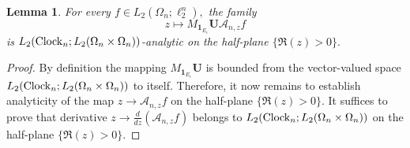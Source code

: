 \documentclass{amsart}
\numberwithin{equation}{section}
\newtheorem{lem}[thm]{Lemma}
\theoremstyle{definition}
\theoremstyle{remark}
\newcommand{\1}{\mathbf 1}
\begin{document}
\begin{lem}\label{final analyticity lemma} For every $f\in L_2(\Omega_n;\ell^{n}_{2}),$ the family
$$
 z\longmapsto M_{\1_{E_{\epsilon}}}\mathbf{U}\mathcal{A}_{n,z}f
$$
is $L_2({\rm Clock}_n;L_2(\Omega_n\times\Omega_n))$-analytic on the half-plane $\{\Re(z)>0\}.$ 
\end{lem}
\begin{proof}
By definition the mapping $M_{\1_{E_{\epsilon}}}\mathbf{U}$ is bounded from the vector-valued space $L_2({\rm Clock}_n;L_2(\Omega_n\times\Omega_n))$ to itself. Therefore, it now remains to establish analyticity of the map
$z\to \mathcal{A}_{n,z}f$ on the half-plane $\{\Re(z)>0\}$. It suffices to prove that derivative $z\to\frac{d}{dz}\left(\mathcal{A}_{n,z}f\right)$ belongs to $L_2({\rm Clock}_n;L_2(\Omega_n\times\Omega_n))$ on the half-plane $\{\Re(z)>0\}.$ 


\end{proof}
\end{document}
